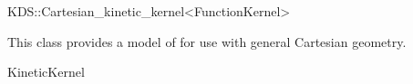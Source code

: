 

\begin{ccRefClass}{KDS::Cartesian_kinetic_kernel<FunctionKernel>}  %


\ccDefinition
  
This class provides a model of  for use with general Cartesian geometry.


\ccIsModel

KineticKernel


\end{ccRefClass}


